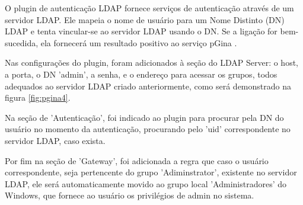 O plugin de autenticação LDAP fornece serviços de autenticação através de um servidor LDAP. Ele mapeia o nome de usuário para um Nome Distinto (DN) LDAP e tenta vincular-se ao servidor LDAP usando o DN. Se a ligação for bem-sucedida, ela fornecerá um resultado positivo ao serviço pGina \cite{pginaldap}.

Nas configurações do plugin, foram adicionados à seção do LDAP Server: o host, a porta, o DN 'admin', a senha, e o endereço para acessar os grupos, todos adequados ao servidor LDAP criado anteriormente, como será demonstrado na figura \ref{fig:pgina4}.

Na seção de 'Autenticação', foi indicado ao plugin para procurar pela DN do usuário no momento da autenticação, procurando pelo 'uid' correspondente no servidor LDAP, caso exista.

Por fim na seção de 'Gateway', foi adicionada a regra que caso o usuário correspondente, seja pertencente do grupo 'Adiminstrator', existente no servidor LDAP, ele será automaticamente movido ao grupo local 'Administradores' do Windows, que fornece ao usuário os privilégios de admin no sistema. 

